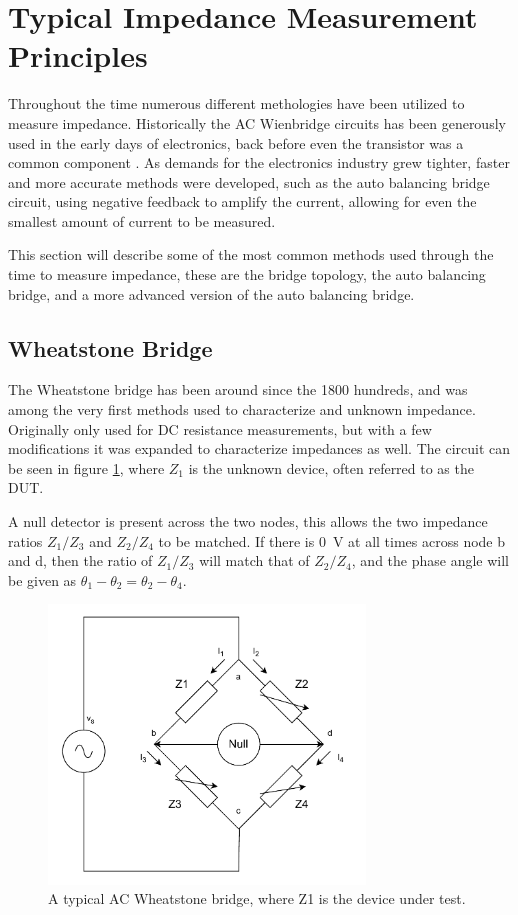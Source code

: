 \section{Typical Impedance Measurement Principles} \label{sec:TypicalMeasPrin}
Throughout the time numerous different methologies have been utilized to measure impedance. Historically the AC Wienbridge circuits has been generously used in the 
early days of electronics, back before even the transistor was a common component \cite{IET_LABS_LCR_PRINCIPLES}. As demands for the electronics industry grew tighter,
faster and more accurate methods were developed, such as the auto balancing bridge circuit, using negative feedback to amplify the current, allowing for even the
smallest amount of current to be measured.

This section will describe some of the most common methods used through the time to measure impedance, these are the bridge topology, the auto balancing bridge, and a more advanced version of the auto balancing bridge. 

\subsection{Wheatstone Bridge}
The Wheatstone bridge has been around since the 1800 hundreds, and was among the very first methods used to characterize and unknown impedance. Originally only used for DC resistance measurements, but with a few modifications it was expanded to characterize impedances as well. 
The circuit can be seen in figure \ref{fig_4_2_WheatstoneBridge}, where $Z_1$ is the unknown device,
 often referred to as the DUT.
 
A null detector is present across the two nodes, this allows the two impedance ratios $Z_1/Z_3$ and $Z_2/Z_4$
to be matched. If there is \SI{0}{\volt} at all times across node b and d, then the ratio of $Z_1/Z_3$ will match that of
 $Z_2/Z_4$, and the
phase angle will be given as $\theta_1 - \theta_2 = \theta_2 - \theta_4$. 

\begin{figure}[H]
    \centering
    \includegraphics[width=0.75\textwidth]{Sections/4_TechnicalAnalysis/Figures_JFT/WheatstoneBridgeAC.pdf}
    \caption{A typical AC Wheatstone bridge, where Z1 is the device under test.}
    \label{fig_4_2_WheatstoneBridge}
\end{figure}

